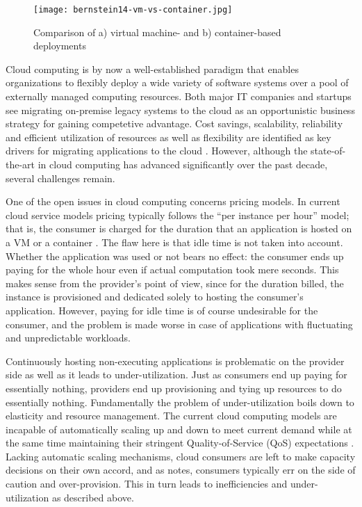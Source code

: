 \begin{figure}[h]
  \centering
  \texttt{[image: bernstein14-vm-vs-container.jpg]}
  \caption{Comparison of a) virtual machine- and b) container-based deployments \parencite{bernstein14containers}}
  \label{fig:vmVsContainer}
\end{figure}

Cloud computing is by now a well-established paradigm that enables organizations to flexibly deploy a wide variety of software systems over a pool of externally managed computing resources. Both major IT companies and startups see migrating on-premise legacy systems to the cloud as an opportunistic business strategy for gaining competetive advantage. Cost savings, scalability, reliability and efficient utilization of resources as well as flexibility are identified as key drivers for migrating applications to the cloud \parencite{jamshidi13cloudmigrationreview}. However, although the state-of-the-art in cloud computing has advanced significantly over the past decade, several challenges remain.

One of the open issues in cloud computing concerns pricing models. In current cloud service models pricing typically follows the ``per instance per hour'' model; that is, the consumer is charged for the duration that an application is hosted on a VM or a container \parencite{varghese18next}. The flaw here is that idle time is not taken into account. Whether the application was used or not bears no effect: the consumer ends up paying for the whole hour even if actual computation took mere seconds. This makes sense from the provider's point of view, since for the duration billed, the instance is provisioned and dedicated solely to hosting the consumer's application. However, paying for idle time is of course undesirable for the consumer, and the problem is made worse in case of applications with fluctuating and unpredictable workloads.

Continuously hosting non-executing applications is problematic on the provider side as well as it leads to under-utilization. Just as consumers end up paying for essentially nothing, providers end up provisioning and tying up resources to do essentially nothing. Fundamentally the problem of under-utilization boils down to elasticity and resource management. The current cloud computing models are incapable of automatically scaling up and down to meet current demand while at the same time maintaining their stringent Quality-of-Service (QoS) expectations \parencite{buyya2017manifesto}. Lacking automatic scaling mechanisms, cloud consumers are left to make capacity decisions on their own accord, and as \textcite{robert2016serverlessarchitectures} notes, consumers typically err on the side of caution and over-provision. This in turn leads to inefficiencies and under-utilization as described above.

